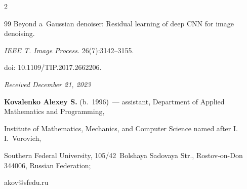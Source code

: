 \begin{multicols}{2}
{{\begin{thebibliography}{99}
    Beyond a~Gaussian denoiser: Residual learning of deep CNN for image denoising. 


\textit{IEEE T. Image Process.}  26(7):3142--3155. 


    doi: 10.1109/TIP.2017.2662206.


\end{thebibliography}





 }


 }





\end{multicols}





\vspace*{-6pt}





\hfill{\small\textit{Received December 21, 2023}} 





\vspace*{-12pt}








\Contrl





\vspace*{-3pt}








\noindent 


\textbf{Kovalenko Alexey S.} (b.\ 1996)~--- assistant, Department of Applied Mathematics and Programming, 


Institute of Mathematics, Mechanics, and Computer Science named after I.\,I.~Vorovich, 


Southern Federal University, 105/42~Bolshaya Sadovaya Str., Rostov-on-Don 344006, Russian Federation; 


\mbox{akov@sfedu.ru}














\label{end\stat}





\renewcommand{\bibname}{\protect\rm Литература} 


